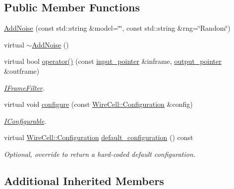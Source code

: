 \subsection*{Public Member Functions}
\begin{DoxyCompactItemize}
\item 
\hyperlink{class_wire_cell_1_1_gen_1_1_add_noise_a0db23621b39f1263e776a033e961bd78}{Add\+Noise} (const std\+::string \&model=\char`\"{}\char`\"{}, const std\+::string \&rng=\char`\"{}Random\char`\"{})
\item 
virtual \hyperlink{class_wire_cell_1_1_gen_1_1_add_noise_abff519ffe2d1d09d7e3e7bc1f50165d4}{$\sim$\+Add\+Noise} ()
\item 
virtual bool \hyperlink{class_wire_cell_1_1_gen_1_1_add_noise_aa5bdb418d61bfb70d1507bd4b1798d53}{operator()} (const \hyperlink{class_wire_cell_1_1_i_function_node_a55c0946156df9b712b8ad1a0b59b2db6}{input\+\_\+pointer} \&inframe, \hyperlink{class_wire_cell_1_1_i_function_node_afc02f1ec60d31aacddf64963f9ca650b}{output\+\_\+pointer} \&outframe)
\begin{DoxyCompactList}\small\item\em \hyperlink{class_wire_cell_1_1_i_frame_filter}{I\+Frame\+Filter}. \end{DoxyCompactList}\item 
virtual void \hyperlink{class_wire_cell_1_1_gen_1_1_add_noise_a4df7ec3fb71fa5dd60b634f3e6d093b1}{configure} (const \hyperlink{namespace_wire_cell_a9f705541fc1d46c608b3d32c182333ee}{Wire\+Cell\+::\+Configuration} \&config)
\begin{DoxyCompactList}\small\item\em \hyperlink{class_wire_cell_1_1_i_configurable}{I\+Configurable}. \end{DoxyCompactList}\item 
virtual \hyperlink{namespace_wire_cell_a9f705541fc1d46c608b3d32c182333ee}{Wire\+Cell\+::\+Configuration} \hyperlink{class_wire_cell_1_1_gen_1_1_add_noise_ad576034249779d453b9472216dd0e1ee}{default\+\_\+configuration} () const
\begin{DoxyCompactList}\small\item\em Optional, override to return a hard-\/coded default configuration. \end{DoxyCompactList}\end{DoxyCompactItemize}
\subsection*{Additional Inherited Members}


